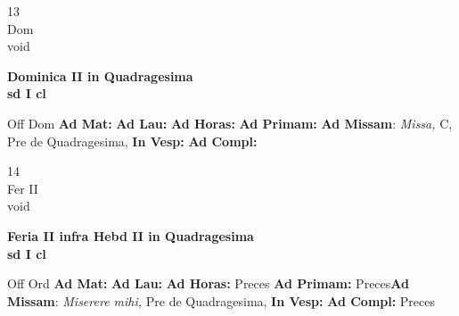 \documentclass[10pt, openany]{book}
\begin{document}
    \begin{center}
        \begin{minipage}{3.5in}
            \vspace{2em}
            \begin{minipage}{0.5in}
                {\Huge 13} \\
                {\normalsize Dom} \\
                {\normalsize void}
            \end{minipage}
            \begin{minipage}{3.0in}
                \textbf{ \large Dominica II in Quadragesima \\
                \textnormal{\normalsize sd I cl}} \\ 
            \end{minipage}
            \begin{justify}Off Dom
                \textbf{Ad Mat: }
                \textbf{Ad Lau: }
                \textbf{Ad Horas: }
                \textbf{Ad Primam: }\textbf{Ad Missam}: \textit{Missa,} C, Pre de Quadragesima,  
                \textbf{In Vesp: }
                \textbf{Ad Compl: }
            \end{justify}
        \end{minipage}
    \end{center}

    \begin{center}
        \begin{minipage}{3.5in}
            \vspace{2em}
            \begin{minipage}{0.5in}
                {\Huge 14} \\
                {\normalsize Fer II} \\
                {\normalsize void}
            \end{minipage}
            \begin{minipage}{3.0in}
                \textbf{ \large Feria II infra Hebd II in Quadragesima \\
                \textnormal{\normalsize sd I cl}} \\ 
            \end{minipage}
            \begin{justify}Off Ord
                \textbf{Ad Mat: }
                \textbf{Ad Lau: }
                \textbf{Ad Horas: }Preces
                \textbf{Ad Primam: }Preces\textbf{Ad Missam}: \textit{Miserere mihi,} Pre de Quadragesima,  
                \textbf{In Vesp: }
                \textbf{Ad Compl: }Preces
            \end{justify}
        \end{minipage}
    \end{center}
\end{document}
